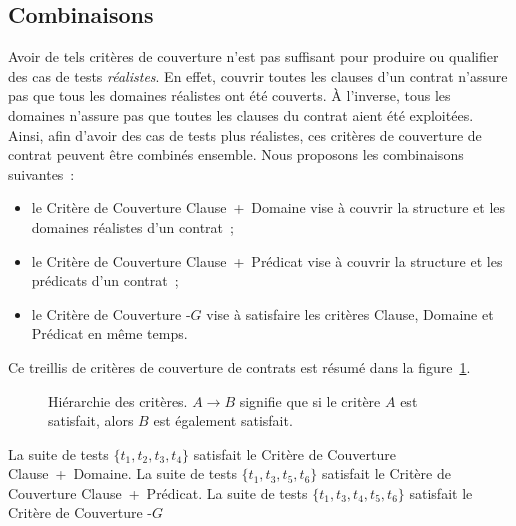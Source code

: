 \subsection{Combinaisons}
\label{subsection:test:combination}

Avoir de tels critères de couverture n'est pas suffisant pour produire ou
qualifier des cas de tests {\em réalistes}. En effet, couvrir toutes les clauses
d'un contrat n'assure pas que tous les domaines réalistes ont été couverts. À
l'inverse, tous les domaines n'assure pas que toutes les clauses du contrat
aient été exploitées. Ainsi, afin d'avoir des cas de tests plus réalistes, ces
critères de couverture de contrat peuvent être combinés ensemble. Nous proposons
les combinaisons suivantes~:
%
\begin{itemize}

\item le Critère de Couverture Clause~+~Domaine vise à couvrir la structure et
les domaines réalistes d'un contrat~;

\item le Critère de Couverture Clause~+~Prédicat vise à couvrir la structure et
les prédicats d'un contrat~;

\item le Critère de Couverture -$G$ vise à satisfaire les
critères Clause, Domaine et Prédicat en même temps.

\end{itemize}
%
Ce {\strong treillis} de critères de couverture de contrats est résumé dans la
figure~\ref{figure:test:lattice}.

\begin{figure}


\caption[Hiérarchie des critères.]{\label{figure:test:lattice} Hiérarchie des
critères. $A \rightarrow B$ signifie que si le critère $A$ est satisfait, alors
$B$ est également satisfait.}

\end{figure}

\begin{example}

La suite de tests $\{t_1, t_2, t_3, t_4\}$ satisfait le Critère de Couverture
Clause~+~Domaine. La suite de tests $\{t_1, t_3, t_5, t_6\}$ satisfait le
Critère de Couverture Clause~+~Prédicat. La suite de tests $\{t_1, t_3, t_4,
t_5, t_6\}$ satisfait le Critère de Couverture -$G$

\end{example}
